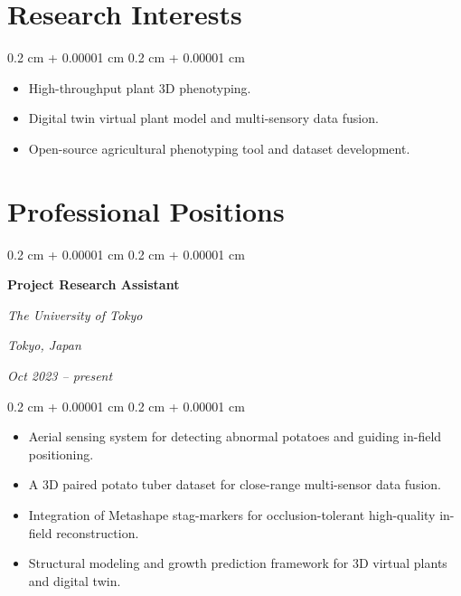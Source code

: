 \documentclass[10pt, a4paper]{article}
\newenvironment{highlights}{
    \begin{itemize}[
        topsep=0.10 cm,
        parsep=0.10 cm,
        partopsep=0pt,
        itemsep=0pt,
        leftmargin=0.4 cm + 10pt
    ]
}{
    \end{itemize}
} %
\newenvironment{highlightsforbulletentries}{
    \begin{itemize}[
        topsep=0.10 cm,
        parsep=0.10 cm,
        partopsep=0pt,
        itemsep=0pt,
        leftmargin=10pt
    ]
}{
    \end{itemize}
} %
\newenvironment{onecolentry}{
    \begin{adjustwidth}{
        0.2 cm + 0.00001 cm
    }{
        0.2 cm + 0.00001 cm
    }
}{
    \end{adjustwidth}
} %
\newenvironment{twocolentry}[2][]{
    \onecolentry
    \def\secondColumn{#2}
    \setcolumnwidth{\fill, 4.5 cm}
    \begin{paracol}{2}
}{
    \switchcolumn \raggedleft \secondColumn
    \end{paracol}
    \endonecolentry
} %
\begin{document}
    \vspace{0.3 cm - 0.3 cm}

    \section{Research Interests}

        \begin{onecolentry}
            \begin{highlightsforbulletentries}

            \item High-throughput plant 3D phenotyping.
            \item Digital twin virtual plant model and multi-sensory data fusion.
            \item Open-source agricultural phenotyping tool and dataset development.

            \end{highlightsforbulletentries}
        \end{onecolentry}

    \section{Professional Positions}
        
        \begin{twocolentry}{
            \textit{Tokyo, Japan}    
            
            \textit{Oct 2023 – present}}
            \textbf{Project Research Assistant}
            
            \textit{The University of Tokyo}
        \end{twocolentry}

        \vspace{0.10 cm}
        \begin{onecolentry}
            \begin{highlights}
                \item Aerial sensing system for detecting abnormal potatoes and guiding in-field positioning.
                \item A 3D paired potato tuber dataset for close-range multi-sensor data fusion.
                \item Integration of Metashape stag-markers for occlusion-tolerant high-quality in-field reconstruction.
                \item Structural modeling and growth prediction framework for 3D virtual plants and digital twin.
            \end{highlights}
        \end{onecolentry}
\end{document}
